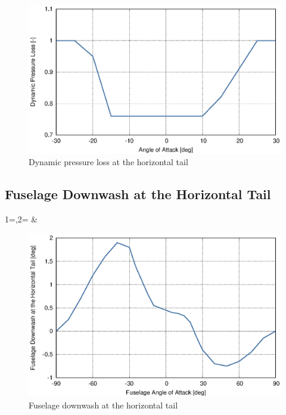 \begin{figure}[h!]
  \centering
  \includegraphics[width=140mm]{eps/uh60_stab_h_press_loss.eps}
  \caption{Dynamic pressure loss at the horizontal tail \cite{NASA-CR-166309}}
\end{figure}


\clearpage
\subsection{Fuselage Downwash at the Horizontal Tail}

{1=\colaoa,2=\coleps}
{\colaoa & \coleps}

\begin{figure}[p!]
  \centering
  \includegraphics[width=140mm]{eps/uh60_stab_h_f_downwash.eps}
  \caption{Fuselage downwash at the horizontal tail \cite{NASA-CR-166309}}
\end{figure}

